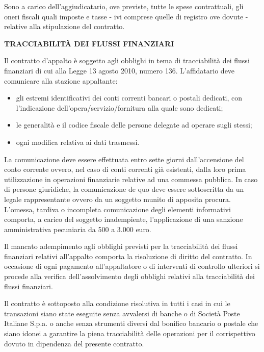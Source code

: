 \documentclass[a4paper,12pt]{letter}
\begin{document}
Sono a carico dell’aggiudicatario, ove previste, tutte le spese contrattuali, gli oneri fiscali quali imposte e tasse - ivi comprese quelle di registro ove dovute - relative alla stipulazione del contratto.

\textbf{TRACCIABILITÀ DEI FLUSSI FINANZIARI}

Il contratto d’appalto è soggetto agli obblighi in tema di tracciabilità dei flussi finanziari di cui alla Legge 13 agosto 2010, numero 136. L’affidatario deve comunicare alla stazione appaltante: 

\begin{itemize}

\item gli estremi identificativi dei conti correnti bancari o postali dedicati, con l'indicazione dell'opera/servizio/fornitura alla quale sono dedicati;

\item le generalità e il codice fiscale delle persone delegate ad operare sugli stessi; 

\item ogni modifica relativa ai dati trasmessi. 
\end{itemize}

La comunicazione deve essere effettuata entro sette giorni dall'accensione del conto corrente ovvero, nel caso di conti correnti già esistenti, dalla loro prima utilizzazione in operazioni finanziarie relative ad una commessa pubblica. In caso di persone giuridiche, la comunicazione de quo deve essere sottoscritta da un legale rappresentante ovvero da un soggetto munito di apposita procura. L'omessa, tardiva o incompleta comunicazione degli elementi informativi comporta, a carico del soggetto inadempiente, l'applicazione di una sanzione amministrativa pecuniaria da 500 a 3.000 euro.

Il mancato adempimento agli obblighi previsti per la tracciabilità dei flussi finanziari relativi all’appalto comporta la risoluzione di diritto del contratto. In occasione di ogni pagamento all’appaltatore o di interventi di controllo ulteriori si procede alla verifica dell’assolvimento degli obblighi relativi alla tracciabilità dei flussi finanziari. 

Il contratto è sottoposto alla condizione risolutiva in tutti i casi in cui le transazioni siano state eseguite senza avvalersi di banche o di Società Poste Italiane S.p.a. o anche senza strumenti diversi dal bonifico bancario o postale che siano idonei a garantire la piena tracciabilità delle operazioni per il corrispettivo dovuto in dipendenza del presente contratto.
\end{document}
